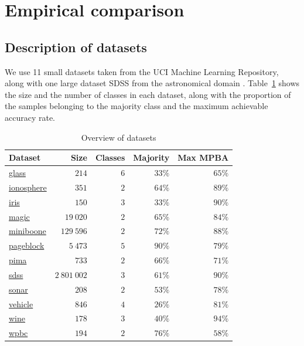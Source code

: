 \documentclass[fleqn,10pt,lineno]{wlpeerj} %
\begin{document}
\section*{Empirical comparison}

\subsection*{Description of datasets}

We use 11 small datasets taken from the UCI Machine Learning Repository, along
with one large dataset SDSS from the astronomical domain \citep{alam15}.
Table~\ref{tab:datasets} shows the size and the number of classes in each
dataset, along with the proportion of the samples belonging to the majority
class and the maximum achievable accuracy rate.

\begin{table}[h]
	\caption {Overview of datasets} \label{tab:datasets}
	\centering
	\begin{tabular}{lrrrr}
		\toprule
		{Dataset}  & Size &  Classes & Majority & Max MPBA \\
		\midrule
        \href{https://archive.ics.uci.edu/ml/datasets/Glass+Identification}{glass}
        	& $214$ & $6$ & $33\%$ & $65\%$ \\
		\href{https://archive.ics.uci.edu/ml/datasets/Ionosphere}{ionosphere}
        	& $351$ & $2$ & $64\%$ & $89\%$ \\
        \href{https://archive.ics.uci.edu/ml/datasets/Iris}{iris}
        	& $150$ & $3$ & $33\%$ & $90\%$ \\
        \href{https://archive.ics.uci.edu/ml/datasets/MAGIC+Gamma+Telescope}{magic}
        	& $19~020$ & $2$ & $65\%$ & $84\%$ \\
        \href{https://archive.ics.uci.edu/ml/datasets/MiniBooNE+particle+identification}{miniboone}
        	& $129~596$ & $2$ & $72\%$ & $88\%$ \\
        \href{https://archive.ics.uci.edu/ml/datasets/Page+Blocks+Classification}{pageblock}
        	& $5~473$ & $5$ & $90\%$ & $79\%$ \\
		\href{https://archive.ics.uci.edu/ml/datasets/Pima+Indians+Diabetes}{pima}
        	& $733$ & $2$ & $66\%$ & $71\%$ \\
        \href{http://dx.doi.org/10.5281/zenodo.58500}{sdss}
        	& $2~801~002$ & $3$ & $61\%$ & $90\%$ \\
		\href{https://archive.ics.uci.edu/ml/datasets/Connectionist+Bench+(Sonar,+Mines+vs.+Rocks)}{sonar}
        	& $208$ & $2$ & $53\%$ & $78\%$ \\
        \href{https://archive.ics.uci.edu/ml/datasets/Statlog+(Vehicle+Silhouettes)}{vehicle}
        	& $846$ & $4$ & $26\%$ & $81\%$ \\
        \href{https://archive.ics.uci.edu/ml/datasets/Wine}{wine}
        	& $178$ & $3$ & $40\%$ & $94\%$ \\
		\href{https://archive.ics.uci.edu/ml/datasets/Breast+Cancer+Wisconsin+(Prognostic)}{wpbc}
        	& $194$ & $2$ & $76\%$ & $58\%$ \\
		\bottomrule
	\end{tabular}
\end{table}
\end{document}
